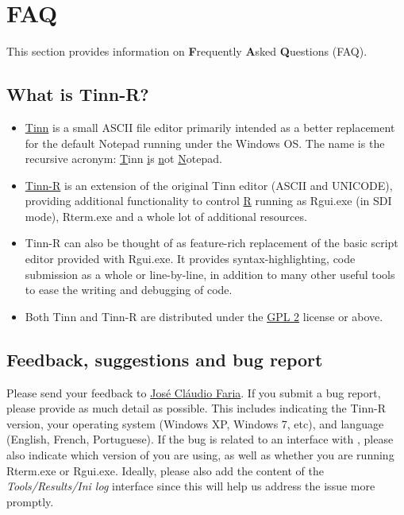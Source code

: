 
\hypertarget{basic_faq}{}
\section{FAQ}

This section provides information on \textbf{F}requently \textbf{A}sked
\textbf{Q}uestions (FAQ).


\subsection{What is Tinn-R?}

\begin{itemize}
  \item \href{https://sourceforge.net/projects/tinn/files/TinnMDI/}{Tinn} is a small
    ASCII file editor primarily intended as a better replacement for
    the default Notepad running under the Windows OS. The name is the
    recursive acronym: \underline{T}inn \underline{i}s \underline{n}ot
    \underline{N}otepad.
  \item \href{https://tinn-r.org/en/}{Tinn-R}
    is an extension of the original Tinn editor (ASCII and UNICODE), providing additional
    functionality to control
    \href{http://cran.r-project.org}{R}
    running as Rgui.exe (in SDI mode), Rterm.exe and a whole lot of additional resources.
  \item Tinn-R can also be thought of as feature-rich replacement of the
    basic script editor provided with Rgui.exe. It provides syntax-highlighting,
    code submission as a whole or line-by-line, in addition to many other
    useful tools to ease the writing and debugging of \RR{} code.
  \item Both Tinn and Tinn-R are distributed under the
    \href{http://www.gnu.org/copyleft/gpl.html}{GPL 2}
    license or above.
\end{itemize}


\subsection{Feedback, suggestions and bug report}

Please send your feedback to
\href{mailto:joseclaudio.faria@gmail.com}{José Cláudio Faria}.
If you submit a bug report, please provide as much detail as possible. This
includes indicating the Tinn-R version, your operating system (Windows XP,
Windows 7, etc), and language (English, French, Portuguese). If the bug
is related to an interface with \RR{}, please also indicate which version of
\RR{} you are using, as well as whether you are running Rterm.exe or Rgui.exe. Ideally,
please also add the content of the \textit{Tools/Results/Ini log}
interface since this will help us address the issue more promptly.



